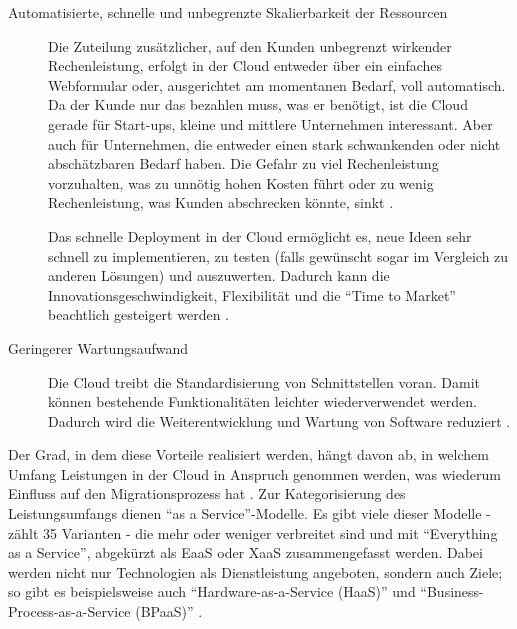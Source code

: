 \begin{description}
	\item[Automatisierte, schnelle und unbegrenzte Skalierbarkeit der
Ressourcen] Die Zuteilung zusätzlicher, auf den Kunden unbegrenzt wirkender
Rechenleistung, erfolgt in der Cloud entweder über ein einfaches Webformular oder,
ausgerichtet am momentanen Bedarf, voll automatisch. Da der Kunde nur das
bezahlen muss, was er benötigt, ist die Cloud gerade für Start-ups, kleine und
mittlere Unternehmen interessant. Aber auch für Unternehmen, die entweder einen stark
schwankenden oder nicht abschätzbaren Bedarf haben. Die Gefahr zu viel
Rechenleistung vorzuhalten, was zu unnötig hohen Kosten führt oder zu wenig
Rechenleistung, was Kunden abschrecken könnte,
sinkt 
.

Das schnelle Deployment in der Cloud ermöglicht es, neue Ideen sehr
schnell zu implementieren, zu testen (falls gewünscht sogar im Vergleich zu
anderen Lösungen) und auszuwerten. Dadurch kann die Innovationsgeschwindigkeit,
Flexibilität und die "`Time to Market"' beachtlich gesteigert werden 
.

	\item[Geringerer Wartungsaufwand] Die Cloud treibt die Standardisierung
von Schnittstellen voran. Damit können bestehende Funktionalitäten leichter
wiederverwendet werden. Dadurch wird die Weiterentwicklung und Wartung
von Software reduziert .
\end{description}

Der Grad, in dem diese Vorteile realisiert werden, hängt davon ab, 
in welchem Umfang Leistungen in der Cloud in Anspruch genommen werden, was 
wiederum Einfluss auf den Migrationsprozess hat . Zur 
Kategorisierung des Leistungsumfangs dienen "`as a Service"'-Modelle. Es
gibt viele dieser Modelle -  zählt 35
Varianten - die mehr oder weniger verbreitet sind und mit "`Everything as a
Service"', abgekürzt als EaaS oder XaaS zusammengefasst werden. Dabei werden
nicht nur Technologien als Dienstleistung angeboten, sondern auch Ziele; so gibt
es beispielsweise auch "`Hardware-as-a-Service (HaaS)"' und
"`Business-Process-as-a-Service (BPaaS)"'
.

